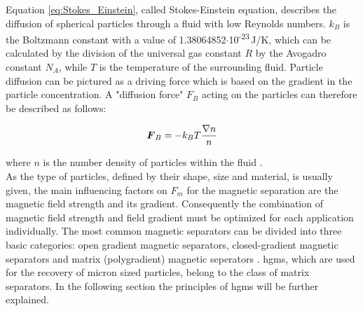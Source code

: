 Equation \ref{eq:Stokes_Einstein}, called Stokes-Einstein equation, describes the diffusion of spherical particles through a fluid with low Reynolds numbers. $k_{B}$ is the Boltzmann constant with a value of 1.38064852$\cdotp$10\textsuperscript{-23}\,J/K, which can be calculated by the division of the universal gas constant $R$ by the Avogadro constant $N_{A}$, while $T$ is the temperature of the surrounding fluid. Particle diffusion can be pictured as a driving force which is based on the gradient in the particle concentration. 
A "diffusion force" $F_{B}$ acting on the particles can therefore be described as follows:

\begin{equation}
\label{eq:mag_force}
\centering
\boldsymbol{F}_{B} = -k_{B}T\frac{\nabla n}{n}
\end{equation}

where $n$ is the number density of particles within the fluid \cite{choomphon2017simulation}\cite{moeser2004high}\cite{fletcher1991fine}. \\
As the type of particles, defined by their shape, size and material, is usually given, the main influencing factors on $F_{m}$ for the magnetic separation are the magnetic field strength and its gradient. Consequently the combination of magnetic field strength and field gradient must be optimized for each application individually. The most common magnetic separators can be divided into three basic categories: open gradient magnetic separators, closed-gradient magnetic separators and matrix (polygradient) magnetic seperators \cite{svoboda2004magnetic}. \Gls{hgms}, which are used for the recovery of micron sized particles, belong to the class of matrix separators. In the following section the principles of \gls{hgms} will be further explained.  


